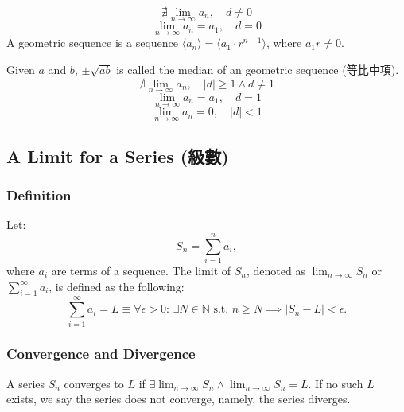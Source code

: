 \documentclass[a4paper,12pt]{report}
\begin{document}
\[\nexists\lim_{n\to\infty}a_n,\quad d\neq 0\]
\[\lim_{n\to\infty}a_n=a_1,\quad d=0\]
A geometric sequence is a sequence $\langle a_n\rangle=\langle a_1\cdot r^{n-1}\rangle$, where $a_1r\neq 0$.

Given $a$ and $b$, $\pm\sqrt{ab}$ is called the median of an geometric sequence (等比中項).
\[\nexists\lim_{n\to\infty}a_n,\quad |d|\geq 1\land d\neq 1\]
\[\lim_{n\to\infty}a_n=a_1,\quad d=1\]
\[\lim_{n\to\infty}a_n=0,\quad |d|<1\]
\subsection{A Limit for a Series (級數)}
\subsubsection{Definition}
Let:
\[S_n = \sum_{i=1}^n a_i,\]
where \(a_i\) are terms of a sequence. The limit of \(S_n\), denoted as \(\lim_{n\to\infty}S_n\) or \(\sum_{i=1}^{\infty}a_i\), is defined as the following:
\[\sum_{i=1}^{\infty}a_i = L \equiv \forall \epsilon > 0:\, \exists N \in\mathbb{N}\text{\ s.t.\ } n \geq N\implies |S_n - L| < \epsilon.\]
\subsubsection{Convergence and Divergence}
A series \(S_n\) converges to \(L\) if \(\exists \lim_{n \to \infty} S_n \land \lim_{n \to \infty} S_n = L\). If no such \(L\) exists, we say the series does not converge, namely, the series diverges.
\end{document}
